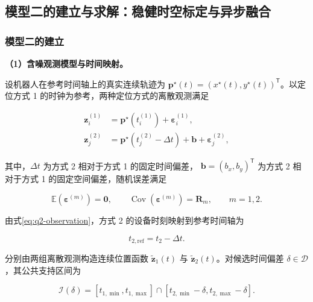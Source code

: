 \subsection{模型二的建立与求解：稳健时空标定与异步融合}\label{sec:model-q2}

\subsubsection{模型二的建立}\label{sec:q2-establishment}

\noindent\textbf{（1）含噪观测模型与时间映射。}

设机器人在参考时间轴上的真实连续轨迹为
\(\mathbf p^\star(t)=(x^\star(t),y^\star(t))^\mathsf T\)。以定位方式 1
的时钟为参考，两种定位方式的离散观测满足

\begin{equation}
\begin{aligned}
\mathbf z_i^{(1)}
  &=\mathbf p^\star\!\left(t_i^{(1)}\right)
    +\boldsymbol\varepsilon_i^{(1)},\\
\mathbf z_j^{(2)}
  &=\mathbf p^\star\!\left(t_j^{(2)}-\Delta t\right)
    +\mathbf b+\boldsymbol\varepsilon_j^{(2)},
\end{aligned}
\label{eq:q2-observation}
\end{equation}

其中，\(\Delta t\) 为方式 2 相对于方式 1 的固定时间偏差，
\(\mathbf b=(b_x,b_y)^\mathsf T\) 为方式 2 相对于方式 1
的固定空间偏差，随机误差满足

\begin{equation}
\mathbb E\!\left(\boldsymbol\varepsilon^{(m)}\right)=\mathbf 0,\qquad
\operatorname{Cov}\!\left(\boldsymbol\varepsilon^{(m)}\right)=\mathbf R_m,
\qquad m=1,2.
\label{eq:q2-noise-assumption}
\end{equation}

由式\eqref{eq:q2-observation}，方式 2 的设备时刻映射到参考时间轴为

\begin{equation}
t_{2,\mathrm{ref}}=t_2-\Delta t.
\label{eq:q2-time-map}
\end{equation}

分别由两组离散观测构造连续位置函数
\(\widetilde{\mathbf z}_1(t)\) 与
\(\widetilde{\mathbf z}_2(t)\)。对候选时间偏差
\(\delta\in\mathcal D\)，其公共支持区间为

\begin{equation}
\mathcal I(\delta)=
[t_{1,\min},t_{1,\max}]
\cap[t_{2,\min}-\delta,t_{2,\max}-\delta].
\label{eq:q2-overlap}
\end{equation}

